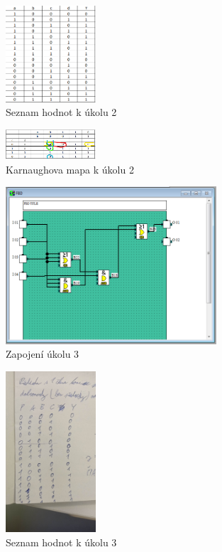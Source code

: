\documentclass[a4paper]{article}
\begin{document}
\begin{figure}[H]
	\centering
	\includegraphics[width=0.3\textwidth]{hodnoty1.png}
	\caption{Seznam hodnot k úkolu 2}
	\label{fig:hodnoty1}
\end{figure}

\begin{figure}[H]
	\centering
	\includegraphics[width=0.3\textwidth]{hodnoty3.png}
	\caption{Karnaughova mapa k úkolu 2}
	\label{fig:hodnoty2}
\end{figure}


\begin{figure}[H]
	\centering
	\includegraphics[width=0.7\textwidth]{PLC_3.png}
	\caption{Zapojení úkolu 3}
	\label{fig:mesh3}
\end{figure}

\begin{figure}[H]
	\centering
	\includegraphics[width=0.3\textwidth]{foto1.jpg}
	\caption{Seznam hodnot k úkolu 3}
	\label{fig:foto1}
\end{figure}
\end{document}
